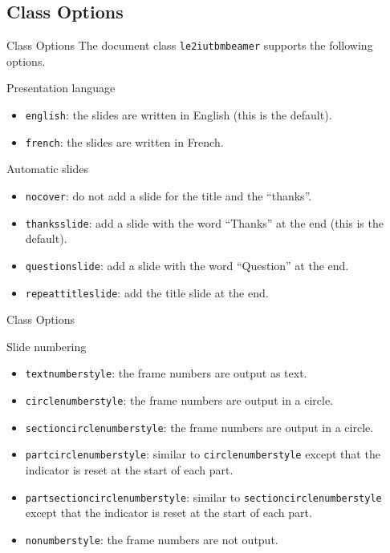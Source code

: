 \documentclass[english,sectioncirclenumberstyle]{le2iutbmbeamer}
\begin{document}
\subsection{Class Options}

\begin{frame}[t]{Class Options}
	The document class \texttt{le2iutbmbeamer} supports the following options.
	\begin{block}{Presentation language}
		\begin{itemize}
		\item \texttt{english}: the slides are written in English (this is the default).
		\item \texttt{french}: the slides are written in French.
		\end{itemize}
	\end{block}
	\begin{block}{Automatic slides}
		\begin{itemize}
		\item \texttt{nocover}: do not add a slide for the title and the ``thanks''.
		\item \texttt{thanksslide}: add a slide with the word ``Thanks'' at the end (this is the default). 
		\item \texttt{questionslide}: add a slide with the word ``Question'' at the end. 
		\item \texttt{repeattitleslide}: add the title slide at the end.
		\end{itemize}
	\end{block}
\end{frame}

\begin{frame}[t]{Class Options \insertcontinuationtext}
	\begin{block}{Slide numbering}
		\begin{itemize}
		\item \texttt{textnumberstyle}: the frame numbers are output as text.\hfill\hyperlink{progressbartypes}{}
		\item \texttt{circlenumberstyle}: the frame numbers are output in a circle.\hfill\hyperlink{progressbartypes}{}
		\item \texttt{sectioncirclenumberstyle}: the frame numbers are output in a circle.\hfill\hyperlink{progressbartypes}{}
		\item \texttt{partcirclenumberstyle}: similar to \texttt{circlenumberstyle} except that the indicator is reset at the start of each part.
		\item \texttt{partsectioncirclenumberstyle}: similar to \texttt{sectioncirclenumberstyle} except that the indicator is reset at the start of each part.
		\item \texttt{nonumberstyle}: the frame numbers are not output.
		\end{itemize}
	\end{block}
\end{frame}
\end{document}
